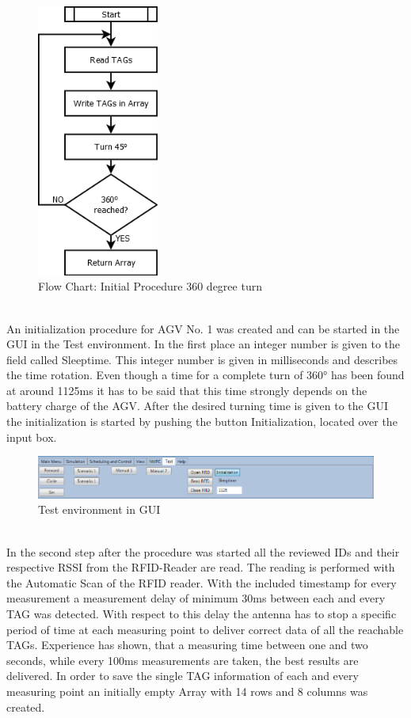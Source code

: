 \begin{figure}[!htbp]
\centering
\includegraphics[width = 4cm]{Pictures/SFC_Init_Procedure}
\caption{Flow Chart: Initial Procedure 360 degree turn}
\label{SFC_Init_Procedure}
\end{figure}\\
An initialization procedure for AGV No. 1 was created and can be started in the GUI in the Test environment. In the first place an integer number is given to the field called Sleeptime. This integer number is given in milliseconds and describes the time rotation. Even though a time for a complete turn of 360° has been found at around 1125ms it has to be said that this time strongly depends on the battery charge of the AGV. After the desired turning time is given to the GUI the initialization is started by pushing the button Initialization, located over the input box.\\
\begin{figure}[!htbp]
\centering
\includegraphics[width = 16cm]{Pictures/Screenshot_Test_environment}
\caption{Test environment in GUI}
\label{Screenshot_Test_environment}
\end{figure}\\
In the second step after the procedure was started all the reviewed IDs and their respective RSSI from the RFID-Reader are read. The reading is performed with the Automatic Scan of the RFID reader. With the included timestamp for every measurement a measurement delay of minimum 30ms between each and every TAG was detected. With respect to this delay the antenna has to stop a specific period of time at each measuring point to deliver correct data of all the reachable TAGs. Experience has shown, that a measuring time between one and two seconds, while every 100ms measurements are taken, the best results are delivered. In order to save the single TAG information of each and every measuring point an initially empty Array with 14 rows and 8 columns was created. 
